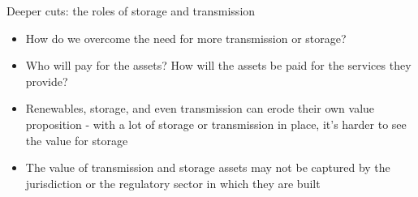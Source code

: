 \documentclass[aspectratio=169]{beamer}
\renewcommand{\(}{\begin{columns}}
\renewcommand{\)}{\end{columns}}
\newcommand{\<}[1]{\begin{column}{#1}}
\renewcommand{\>}{\end{column}}
\begin{document}
\begin{frame}{Deeper cuts: the roles of storage and transmission}
\begin{itemize}
\setlength\itemsep{2em}
\item How do we overcome the need for more transmission or storage?
\item Who will pay for the assets? How will the assets be paid for the services they provide?
\item Renewables, storage, and even transmission can erode their own value proposition - with a lot of storage or transmission in place, it's harder to see the value for storage
\item The value of transmission and storage assets may not be captured by the jurisdiction or the regulatory sector in which they are built

\end{itemize}

\vfill \end{frame}
\end{document}
